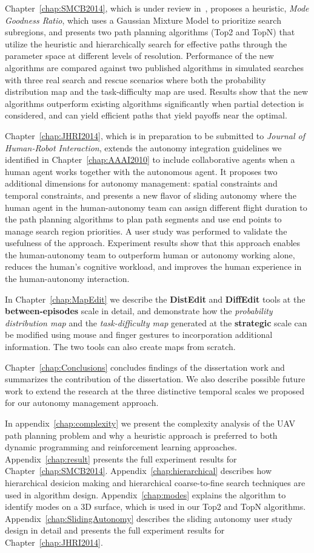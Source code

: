 Chapter~\ref{chap:SMCB2014}, which is under review in~\cite{Lin2014Hierarchical}, proposes a heuristic, \textit{Mode Goodness Ratio}, which uses a Gaussian Mixture Model to prioritize search subregions, and presents two path planning algorithms (Top2 and TopN) that utilize the heuristic and hierarchically search for effective paths through the parameter space at different levels of resolution. Performance of the new algorithms are compared against two published algorithms in simulated searches with three real search and rescue scenarios where both the probability distribution map and the task-difficulty map are used. Results show that the new algorithms outperform existing algorithms significantly when partial detection is considered, and can yield efficient paths that yield payoffs near the optimal. 

Chapter~\ref{chap:JHRI2014}, which is in preparation to be submitted to \textit{Journal of Human-Robot Interaction}, extends the autonomy integration guidelines we identified in Chapter~\ref{chap:AAAI2010} to include collaborative agents when a human agent works together with the autonomous agent. It proposes two additional dimensions for autonomy management: spatial constraints and temporal constraints, and presents a new flavor of sliding autonomy where the human agent in the human-autonomy team can assign different flight duration to the path planning algorithms to plan path segments and use end points to manage search region priorities. A user study was performed to validate the usefulness of the approach. Experiment results show that this approach enables the human-autonomy team to outperform human or autonomy working alone, reduces the human's cognitive workload, and improves the human experience in the human-autonomy interaction.

In Chapter~\ref{chap:MapEdit} we describe the \textbf{DistEdit} and \textbf{DiffEdit} tools at the \textbf{between-episodes} scale in detail, and demonstrate how the \textit{probability distribution map} and the \textit{task-difficulty map} generated at the \textbf{strategic} scale can be modified using mouse and finger gestures to incorporation additional information. The two tools can also create maps from scratch.

Chapter~\ref{chap:Conclusions} concludes findings of the dissertation work and summarizes the contribution of the dissertation. 
We also describe possible future work to extend the research at the three distinctive temporal scales we proposed for our autonomy management approach.

In appendix~\ref{chap:complexity} we present the complexity analysis of the UAV path planning problem and why a heuristic approach is preferred to both dynamic programming and reinforcement learning approaches. Appendix~\ref{chap:result} presents the full experiment results for Chapter~\ref{chap:SMCB2014}. Appendix~\ref{chap:hierarchical} describes how hierarchical desicion making and hierarchical coarse-to-fine search techniques are used in algorithm design. Appendix~\ref{chap:modes} explains the algorithm to identify modes on a 3D surface, which is used in our Top2 and TopN algorithms. Appendix~\ref{chap:SlidingAutonomy} describes the sliding autonomy user study design in detail and presents the full experiment results for Chapter~\ref{chap:JHRI2014}.